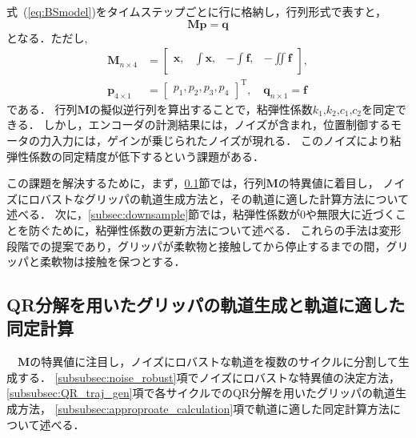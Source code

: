 \documentclass[a4paper]{jarticle}
\begin{document}
式~(\ref{eq:BSmodel})をタイムステップごとに行に格納し，行列形式で表すと，
\begin{equation}
    \mathbf{M}\mathbf{p} = \mathbf{q} 
    \label{eq:Mp_q}
\end{equation}
となる．ただし,
\begin{equation}
    \begin{aligned}
        \mathbf{M}_{n \times 4} &= \begin{bmatrix}
            \boldsymbol{x}, & \int{\boldsymbol{x}}, & -\int{\boldsymbol{f}}, & -\iint{\boldsymbol{f}}\\
        \end{bmatrix}, \\
        \mathbf{p}_{4 \times 1}  &= \begin{bmatrix}
            p_1 ,p_2 ,p_3 ,p_4
        \end{bmatrix}^{\mathrm{T}}, \quad
        \mathbf{q}_{n \times 1}   = \boldsymbol{f}
    \end{aligned}
\label{eq:BSmodel_matrix}
\end{equation}
である．
行列$\mathbf{M}$の擬似逆行列を算出することで，粘弾性係数$k_1$,$k_2$,$c_1$,$c_2$を同定できる．
しかし，エンコーダの計測結果には，ノイズが含まれ，位置制御するモータの力入力には，ゲインが乗じられたノイズが現れる．
このノイズにより粘弾性係数の同定精度が低下するという課題がある．

この課題を解決するために，まず，\ref{subsec:QR_traj_and_calculation}節では，行列$\mathbf{M}$の特異値に着目し，
ノイズにロバストなグリッパの軌道生成方法と，その軌道に適した計算方法について述べる．
次に，\ref{subsec:downsample}節では，粘弾性係数が0や無限大に近づくことを防ぐために，粘弾性係数の更新方法について述べる．
これらの手法は変形段階での提案であり，グリッパが柔軟物と接触してから停止するまでの間，グリッパと柔軟物は接触を保つとする．
\subsection{QR分解を用いたグリッパの軌道生成と軌道に適した同定計算}\label{subsec:QR_traj_and_calculation}
　$\mathbf{M}$の特異値に注目し，ノイズにロバストな軌道を複数のサイクルに分割して生成する．
\ref{subsubsec:noise_robust}項でノイズにロバストな特異値の決定方法，
\ref{subsubsec:QR_traj_gen}項で各サイクルでのQR分解を用いたグリッパの軌道生成方法，
\ref{subsubsec:approproate_calculation}項で軌道に適した同定計算方法について述べる．
\end{document}
